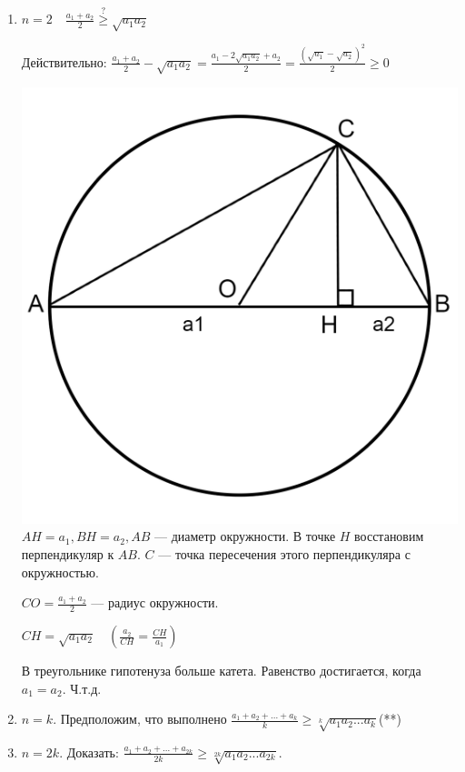 \documentclass{article}
\begin{document}
    \begin{enumerate}
        \item \(n = 2 \quad \frac{a_1 + a_2}{2} \overset{?}{\geq} \sqrt{a_1 a_2}\)
        
        Действительно: \(\frac{a_1 + a_2}{2} - \sqrt{a_1 a_2} = \frac{a_1 - 2\sqrt{a_1 a_2} + a_2}{2} = \frac{(\sqrt{a_1} - \sqrt{a_2})^2}{2} \geq 0\)

        \includegraphics[scale=0.15]{9_1.png}
        \(AH=a_1, BH=a_2, AB\) --- диаметр окружности. В точке \(H\) восстановим перпендикуляр к \(AB\). \(C\) --- точка пересечения этого перпендикуляра с окружностью.

        \(CO=\frac{a_1 + a_2}{2}\) --- радиус окружности.

        \(CH = \sqrt{a_1 a_2} \quad (\frac{a_2}{CH} = \frac{CH}{a_1})\)

        В треугольнике гипотенуза больше катета. Равенство достигается, когда \(a_1 = a_2\). Ч.т.д.

        \item \(n = k\). Предположим, что выполнено \(\frac{a_1 + a_2 + ... + a_k}{k} \geq \sqrt[k]{a_1 a_2 ... a_k}\)\quad(**)
        
        \item \(n = 2k\). Доказать: \(\frac{a_1 + a_2 + ... + a_{2k}}{2k} \geq \sqrt[2k]{a_1 a_2 ... a_{2k}}\).
        

\end{enumerate}
\end{document}
